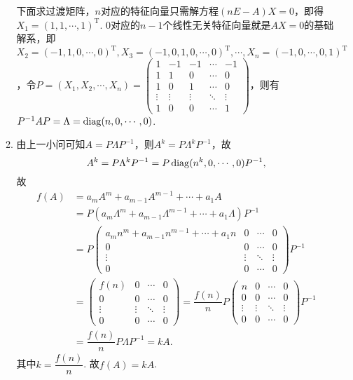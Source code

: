 \begin{enumerate}
\begin{enumerate}
        下面求过渡矩阵，$n$对应的特征向量只需解方程$(nE-A)X=0$，即得$X_1=(1,1,\cdots,1)^\mathrm{T}$. 0对应的$n-1$个线性无关特征向量就是$AX=0$的基础解系，即$X_2=(-1,1,0,\cdots,0)^\mathrm{T},X_3=(-1,0,1,0,\cdots,0)^\mathrm{T},\cdots,X_n=(-1,0,\cdots,0,1)^\mathrm{T}$，令$P=(X_1,X_2,\cdots,X_n)=\begin{pmatrix}
            1 & -1 & -1 & \cdots & -1 \\ 1 & 1 & 0 & \cdots & 0 \\ 1 & 0 & 1 & \cdots & 0 \\ \vdots & \vdots & \vdots & \ddots & \vdots \\ 1 & 0 & 0 & \cdots & 1
        \end{pmatrix}$，则有$P^{-1}AP=\Lambda=\operatorname{diag}(n,0,\cdots,0)$.

        \item 由上一小问可知$A=P\Lambda P^{-1}$，则$A^k=P\Lambda^kP^{-1}$，故
        \[A^k=P\Lambda^kP^{-1}=P\operatorname{diag}(n^k,0,\cdots,0)P^{-1},\]
        故
        \begin{align*}
            f(A)&=a_mA^m+a_{m-1}A^{m-1}+\cdots+a_1A \\
            &=P(a_m\Lambda^m+a_{m-1}\Lambda^{m-1}+\cdots+a_1\Lambda)P^{-1} \\
            &=P\begin{pmatrix}
                a_mn^m+a_{m-1}n^{m-1}+\cdots+a_1n & 0 & \cdots & 0 \\ 0 & 0 & \cdots & 0 \\ \vdots & \vdots & \ddots & \vdots \\ 0 & 0 & \cdots & 0
            \end{pmatrix}P^{-1} \\
            &=\begin{pmatrix}
                f(n) & 0 & \cdots & 0 \\ 0 & 0 & \cdots & 0 \\ \vdots & \vdots & \ddots & \vdots \\ 0 & 0 & \cdots & 0
            \end{pmatrix}=\dfrac{f(n)}{n}P\begin{pmatrix}
                n & 0 & \cdots & 0 \\ 0 & 0 & \cdots & 0 \\ \vdots & \vdots & \ddots & \vdots \\ 0 & 0 & \cdots & 0
            \end{pmatrix}P^{-1} \\
            &=\dfrac{f(n)}{n}P\Lambda P^{-1}=kA.
        \end{align*}
        其中$k=\dfrac{f(n)}{n}$. 故$f(A)=kA$.


\end{enumerate}
\end{enumerate}
